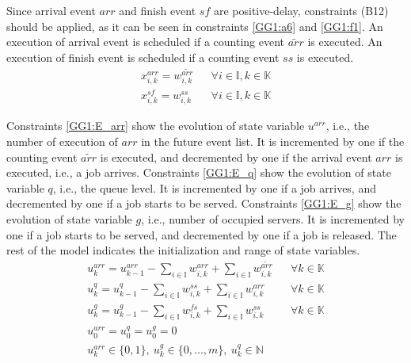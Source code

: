 \documentclass[suppldata]{interact}
\theoremstyle{plain}
\theoremstyle{definition}
\theoremstyle{remark}
\begin{document}
Since arrival event ${arr}$ and finish event ${sf}$ are positive-delay, constraints (B12) should be applied, as it can be seen in constraints \eqref{GG1:a6} and \eqref{GG1:f1}. An execution of arrival event is scheduled if a counting event ${\tilde{arr}}$ is executed. An execution of finish event is scheduled if a counting event ${ss}$ is executed. 
\begin{eqnarray}
	x^{arr}_{i,k} = w^{\tilde{arr}}_{i,k} && \forall i\in \mathbb{I},k\in \mathbb{K} \label{GG1:a6}\\
	x^{sf}_{i,k} = w^{ss}_{i,k} && \forall i\in \mathbb{I},k\in \mathbb{K} \label{GG1:f1}
\end{eqnarray}


Constraints \eqref{GG1:E_arr} show the evolution of state variable $u^{arr}$, i.e., the number of execution of ${arr}$ in the future event list. It is incremented by one if the counting event ${\tilde{arr}}$ is executed, and decremented by one if the arrival event ${arr}$ is executed, i.e., a job arrives. 
Constraints \eqref{GG1:E_q} show the evolution of state variable $q$, i.e., the queue level. It is incremented by one if a job arrives, and decremented by one if a job starts to be served. 
Constraints \eqref{GG1:E_g} show the evolution of state variable $g$, i.e., number of occupied servers. It is incremented by one if a job starts to be served, and decremented by one if a job is released. The rest of the model indicates the initialization and range of state variables.
\begin{eqnarray}
	u^{arr}_k = u^{arr}_{k-1} - \sum_{i\in\mathbb{I}}w^{arr}_{i,k} +\sum_{i\in\mathbb{I}} w^{\tilde{arr}}_{i,k}&&\forall k \in \mathbb{K} \label{GG1:E_arr}\\
	u^{q}_k = u^{q}_{k-1} - \sum_{i\in\mathbb{I}}w^{ss}_{i,k} + \sum_{i\in\mathbb{I}}w^{arr}_{i,k}&&\forall k \in \mathbb{K}\label{GG1:E_q}\\
	u^{g}_k = u^{g}_{k-1} - \sum_{i\in\mathbb{I}}w^{fs}_{i,k} + \sum_{i\in\mathbb{I}}w^{ss}_{i,k}&&\forall k \in \mathbb{K}\label{GG1:E_g}\\
	u^{arr}_0=u^q_0=u^g_0=0\nonumber\\
	u^{arr}_{k}\in\{0,1\},\ u^g_{k}\in\{0,...,m\},\ u^{q}_k\in \mathbb{N}\nonumber
\end{eqnarray}
\end{document}
